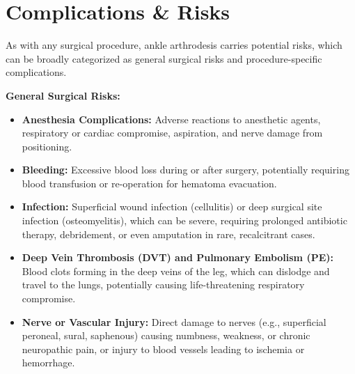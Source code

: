 \section*{Complications \& Risks}
As with any surgical procedure, ankle arthrodesis carries potential risks, which can be broadly categorized as general surgical risks and procedure-specific complications.

\textbf{General Surgical Risks:}
\begin{itemize}
  \item \textbf{Anesthesia Complications:} Adverse reactions to anesthetic agents, respiratory or cardiac compromise, aspiration, and nerve damage from positioning.
  
  \item \textbf{Bleeding:} Excessive blood loss during or after surgery, potentially requiring blood transfusion or re-operation for hematoma evacuation.
  
  \item \textbf{Infection:} Superficial wound infection (cellulitis) or deep surgical site infection (osteomyelitis), which can be severe, requiring prolonged antibiotic therapy, debridement, or even amputation in rare, recalcitrant cases.
  
  \item \textbf{Deep Vein Thrombosis (DVT) and Pulmonary Embolism (PE):} Blood clots forming in the deep veins of the leg, which can dislodge and travel to the lungs, potentially causing life-threatening respiratory compromise.
  
  \item \textbf{Nerve or Vascular Injury:} Direct damage to nerves (e.g., superficial peroneal, sural, saphenous) causing numbness, weakness, or chronic neuropathic pain, or injury to blood vessels leading to ischemia or hemorrhage.
\end{itemize}

